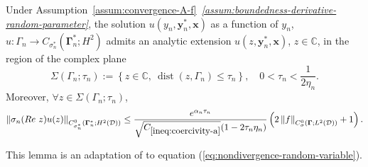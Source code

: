 \documentclass[final,onefignum,onetabnum]{mousaviart}
\begin{document}
		\vspace*{1mm}
		\begin{lemma}
			\label{lem:analytic-exte}
			Under Assumption~\ref{assum:convergence-A-f}~\textit{\ref{assum:boundedness-derivative-random-parameter}}, the solution $u(y_n, \boldsymbol{y}_n^*, \boldsymbol{x})$ as a function of $y_n$, $u:\Gamma_n \rightarrow C_{\sigma_n^*}\left( \boldsymbol{\Gamma}_n^*; H^2 \right)$ admits an analytic extension $u(z, \boldsymbol{y}_n^*, \boldsymbol{x})$, $z \in \mathbb{C}$, in the region of the complex plane 
			\begin{equation*}
				\Sigma(\Gamma_n; \tau_n):=\left\lbrace 
				z \in \mathbb{C},~ \operatorname{dist}(z, \Gamma_n) \leq \tau_n
				\right\rbrace,  \quad 
				0 < \tau_n < \frac{1}{2\eta_n}.
			\end{equation*}
			Moreover, $\forall z \in \Sigma(\Gamma_n; \tau_n)$,
			\begin{equation}
				\label{analytic-solution-upper-bound}
				\left\| 
				\sigma_n(Re~z) u(z)
				\right\|_{C^0_{\sigma_n^*}\left( \boldsymbol{\Gamma}_n^*; H^2(\mathcal{D}) \right) } 
				\leq
				\dfrac{e^{\alpha_n \tau_n}}{\sqrt{C_{\ref{ineq:coercivity-a}}}(1-2\tau_n \eta_n)} \left( 
				2 \left\| f \right\|_{C^0_{\sigma}\left( \boldsymbol{\Gamma}; L^2(\mathcal{D}) \right) } +1
				\right).
			\end{equation}
		\end{lemma}
		
		\vspace*{1mm}
		This lemma is an adaptation of {\cite[Lemma~3.2]{Babuska-Nobile-Tempone}} to equation (\ref{eq:nondivergence-random-variable}).
		
\end{document}
